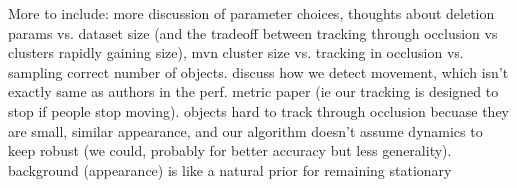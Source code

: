 \documentclass[smallcondensed, final]{svjour3}
\begin{document}
More to include: more discussion of parameter choices, thoughts about deletion params vs. dataset size (and the tradeoff between tracking through occlusion vs clusters rapidly gaining size), mvn cluster size vs. tracking in occlusion vs. sampling correct number of objects. discuss how we detect movement, which isn’t exactly same as authors in the perf. metric paper (ie our tracking is designed to stop if people stop moving). objects hard to track through occlusion becuase they are small, similar appearance, and our algorithm doesn’t assume dynamics to keep robust (we could, probably for better accuracy but less generality). background (appearance) is like a natural prior for remaining stationary



















\begin{small}

 
\end{small}
\end{document}
